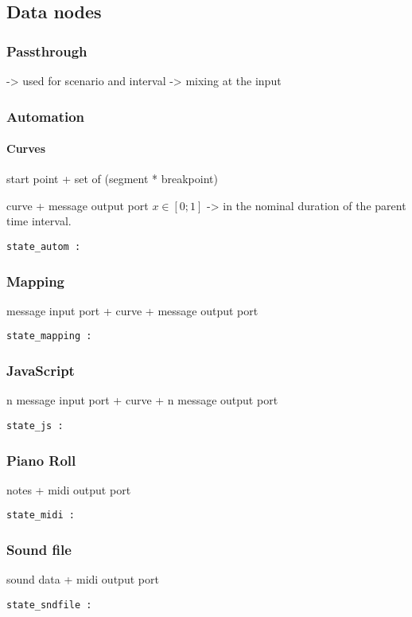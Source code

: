 \documentclass[applsci,article,submit,moreauthors,pdftex,10pt,a4paper]{mdpi}
\begin{document}
\subsection{Data nodes}
\subsubsection{Passthrough}
-> used for scenario and interval
-> mixing at the input


\subsubsection{Automation}
\paragraph{Curves}
start point + set of (segment * breakpoint)

curve + message output port
$x\in[0;1]$ -> in the nominal duration of the parent time interval.

\begin{lstlisting}
state_autom :
\end{lstlisting}
\subsubsection{Mapping}
message input port + curve + message output port
\begin{lstlisting}
state_mapping :
\end{lstlisting}
\subsubsection{JavaScript}
n message input port + curve + n message output port
\begin{lstlisting}
state_js :
\end{lstlisting}
\subsubsection{Piano Roll}
notes + midi output port
\begin{lstlisting}
state_midi :
\end{lstlisting}
\subsubsection{Sound file}
sound data + midi output port
\begin{lstlisting}
state_sndfile :
\end{lstlisting}
\end{document}
